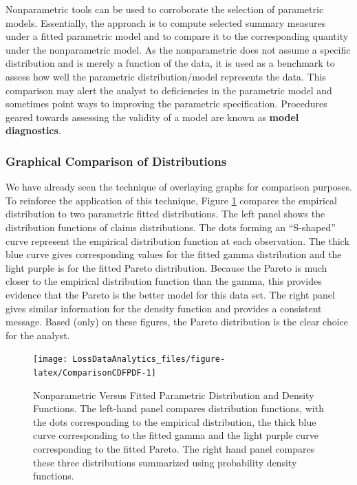 \documentclass[]{book}
\theoremstyle{definition}
\theoremstyle{definition}
\theoremstyle{definition}
\theoremstyle{remark}
\begin{document}
Nonparametric tools can be used to corroborate the selection of
parametric models. Essentially, the approach is to compute selected
summary measures under a fitted parametric model and to compare it to
the corresponding quantity under the nonparametric model. As the
nonparametric does not assume a specific distribution and is merely a
function of the data, it is used as a benchmark to assess how well the
parametric distribution/model represents the data. This comparison may
alert the analyst to deficiencies in the parametric model and sometimes
point ways to improving the parametric specification. Procedures geared
towards assessing the validity of a model are known as \textbf{model
diagnostics}.

\subsubsection{Graphical Comparison of
Distributions}\label{S:MS:GraphComparison}

We have already seen the technique of overlaying graphs for comparison
purposes. To reinforce the application of this technique, Figure
\ref{fig:ComparisonCDFPDF} compares the empirical distribution to two
parametric fitted distributions. The left panel shows the distribution
functions of claims distributions. The dots forming an ``S-shaped''
curve represent the empirical distribution function at each observation.
The thick blue curve gives corresponding values for the fitted gamma
distribution and the light purple is for the fitted Pareto distribution.
Because the Pareto is much closer to the empirical distribution function
than the gamma, this provides evidence that the Pareto is the better
model for this data set. The right panel gives similar information for
the density function and provides a consistent message. Based (only) on
these figures, the Pareto distribution is the clear choice for the
analyst.

\begin{figure}

{\centering \texttt{[image: LossDataAnalytics\_files/figure-latex/ComparisonCDFPDF-1]} 

}

\caption{Nonparametric Versus Fitted Parametric Distribution and Density Functions. The left-hand panel compares distribution functions, with the dots corresponding to the empirical distribution, the thick blue curve corresponding to the fitted gamma and the light purple curve corresponding to the fitted Pareto. The right hand panel compares these three distributions summarized using probability density functions.}\label{fig:ComparisonCDFPDF}
\end{figure}
\end{document}

